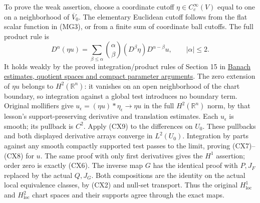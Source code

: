 \documentclass[
  11pt,
]{article}
\begin{document}
To prove the weak assertion, choose a coordinate cutoff
\(\eta\in C_c^\infty(V)\) equal to one on a neighborhood of
\(\overline V_0\). The elementary Euclidean cutoff follows from the flat
scalar function in (MG3), or from a finite sum of coordinate ball
cutoffs. The full product rule is \[
 D^\alpha(\eta u)=
   \sum_{\beta\leq\alpha}
       \binom{\alpha}{\beta}(D^\beta\eta)D^{\alpha-\beta}u,
       \qquad |\alpha|\leq2 .
\] It holds weakly by the proved integration/product rules of Section 15
in \href{banach-foundation-bridges.pdf}{Banach estimates, quotient spaces
and compact parameter arguments}. The zero extension of \(\eta u\)
belongs to \(H^2(\mathbb R^n)\): it vanishes on an open neighborhood of
the chart boundary, so integration against a global test introduces no
boundary term. Original mollifiers give
\(u_\epsilon=(\eta u)*\eta_\epsilon\to\eta u\) in the full
\(H^2(\mathbb R^n)\) norm, by that lesson's support-preserving
derivative and translation estimates. Each \(u_\epsilon\) is smooth; its
pullback is \(C^2\). Apply (CX9) to the differences on \(U_0\). These
pullbacks and both displayed derivative arrays converge in \(L^2(U_0)\).
Integration by parts against any smooth compactly supported test passes
to the limit, proving (CX7)--(CX8) for \(u\). The same proof with only
first derivatives gives the \(H^1\) assertion; order zero is exactly
(CX6). The inverse map \(G\) has the identical proof with \(P,J_F\)
replaced by the actual \(Q,J_G\). Both compositions are the identity on
the actual local equivalence classes, by (CX2) and null-set transport.
Thus the original \(H^1_{\mathrm{loc}}\) and \(H^2_{\mathrm{loc}}\)
chart spaces and their supports agree through the exact maps.
\end{document}
